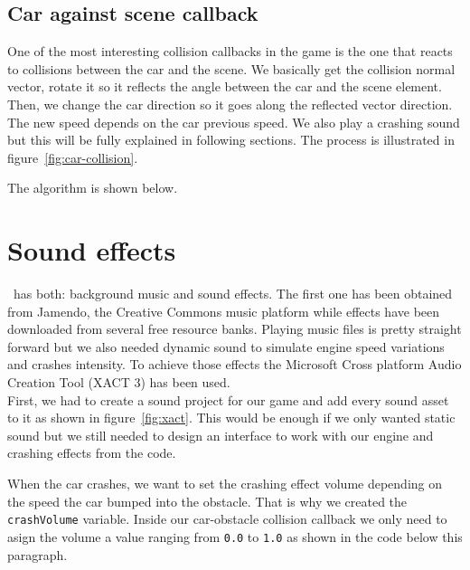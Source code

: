 \subsection{Car against scene callback}

One of the most interesting collision callbacks in the game is the one that reacts to 
collisions between the car and the scene. We basically get the collision normal vector,
rotate it so it reflects the angle between the car and the scene element. Then, we change the
car direction so it goes along the reflected vector direction. The new speed depends on the
car previous speed. We also play a crashing sound but this will be fully explained in following
sections. The process is illustrated in figure~\ref{fig:car-collision}.


The algorithm is shown below.\\



\section{Sound effects}
 
\game\ has both: background music and sound effects. The first one has been obtained from
Jamendo, the Creative Commons \cite{website:cc} music platform while effects have been
downloaded from several free resource banks. Playing music files is pretty straight forward
but we also needed dynamic sound to simulate engine speed variations and crashes intensity.
To achieve those effects the Microsoft Cross platform Audio Creation Tool (XACT 3) has
been used.\\

First, we had to create a sound project for our game and add every sound asset to it as
shown in figure~\ref{fig:xact}. This would be enough if we only wanted static sound but we
still needed to design an interface to work with our engine and crashing effects from the
code.\\


When the car crashes, we want to set the crashing effect volume depending on the speed
the car bumped into the obstacle. That is why we created the \texttt{crashVolume} variable.
Inside our car-obstacle collision callback we only need to asign the volume a value ranging
from \texttt{0.0} to \texttt{1.0} as shown in the code below this paragraph.

